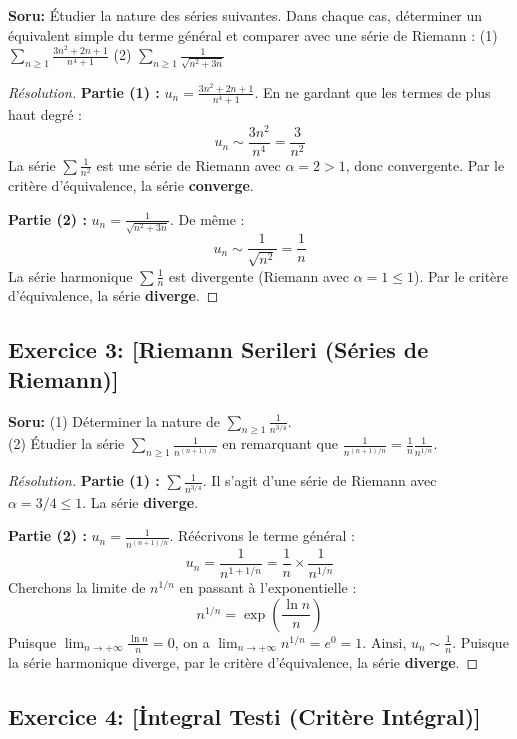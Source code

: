 \documentclass[12pt,a4paper]{report}
\begin{document}
\textbf{Soru:}
Étudier la nature des séries suivantes. Dans chaque cas, déterminer un équivalent simple du terme général et comparer avec une série de Riemann :
(1) $\sum_{n \ge 1} \frac{3n^2+2n+1}{n^4+1}$ \qquad (2) $\sum_{n \ge 1} \frac{1}{\sqrt{n^2+3n}}$

\begin{proof}[Résolution]
\textbf{Partie (1) :} $u_n = \frac{3n^2+2n+1}{n^4+1}$.
En ne gardant que les termes de plus haut degré :
\[ u_n \sim \frac{3n^2}{n^4} = \frac{3}{n^2} \]
La série $\sum \frac{1}{n^2}$ est une série de Riemann avec $\alpha = 2 > 1$, donc convergente.
Par le critère d'équivalence, la série \textbf{converge}.

\textbf{Partie (2) :} $u_n = \frac{1}{\sqrt{n^2+3n}}$.
De même :
\[ u_n \sim \frac{1}{\sqrt{n^2}} = \frac{1}{n} \]
La série harmonique $\sum \frac{1}{n}$ est divergente (Riemann avec $\alpha = 1 \le 1$).
Par le critère d'équivalence, la série \textbf{diverge}.
\end{proof}

\subsection*{Exercice 3: [Riemann Serileri (Séries de Riemann)]}

\textbf{Soru:}
(1) Déterminer la nature de $\sum_{n \ge 1} \frac{1}{n^{3/4}}$.\\
(2) Étudier la série $\sum_{n \ge 1} \frac{1}{n^{(n+1)/n}}$ en remarquant que $\frac{1}{n^{(n+1)/n}} = \frac{1}{n} \frac{1}{n^{1/n}}$.

\begin{proof}[Résolution]
\textbf{Partie (1) :} $\sum \frac{1}{n^{3/4}}$.
Il s'agit d'une série de Riemann avec $\alpha = 3/4 \le 1$. La série \textbf{diverge}.

\textbf{Partie (2) :} $u_n = \frac{1}{n^{(n+1)/n}}$.
Réécrivons le terme général :
\[ u_n = \frac{1}{n^{1 + 1/n}} = \frac{1}{n} \times \frac{1}{n^{1/n}} \]
Cherchons la limite de $n^{1/n}$ en passant à l'exponentielle :
\[ n^{1/n} = \exp\left( \frac{\ln n}{n} \right) \]
Puisque $\lim_{n \to +\infty} \frac{\ln n}{n} = 0$, on a $\lim_{n \to +\infty} n^{1/n} = e^0 = 1$.
Ainsi, $u_n \sim \frac{1}{n}$.
Puisque la série harmonique diverge, par le critère d'équivalence, la série \textbf{diverge}.
\end{proof}

\subsection*{Exercice 4: [İntegral Testi (Critère Intégral)]}
\end{document}
